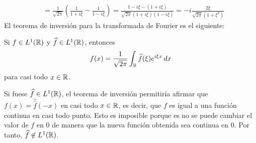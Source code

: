 \documentclass[a4paper, 12pt, extrafontsizes]{memoir}
\begin{document}
\begin{solution}
\begin{enumerate}
\begin{align*}
        &= \frac{1}{\sqrt{2\pi}}\left(\frac{1}{1+i\xi} -\frac{1}{1-i\xi}\right) = \frac{1-i\xi-(1+i\xi)}{\sqrt{2\pi}(1+i\xi)(1-i\xi)}  = -i\frac{2\xi}{\sqrt{2\pi}(1+\xi^2)}
    \end{align*}
    El teorema de inversión para la transformada de Fourier es el siguiente:
    \begin{theorem}
        Si $f \in L^1(\mathbb R)$ y $\widehat{f} \in L^1(\mathbb R)$, entonces
        \[f(x) = \frac{1}{\sqrt{2\pi}}\int_\mathbb R \widehat{f}(\xi)e^{i\xi x} \, dx\]
        para casi todo $x \in \mathbb R$.
    \end{theorem}
    Si fuese $\widehat{f}\in L^1(\mathbb R)$, el teorema de inversión permitiría afirmar que $f(x) = \widehat{\widehat{f}}(-x)$ en casi todo $x \in \mathbb R$, es decir, que $f$ es igual a una función continua en casi todo punto. Esto es imposible porque es no se puede cambiar el valor de $f$ en $0$ de manera que la nueva función obtenida sea continua en $0$. Por tanto, $\widehat{f} \not\in L^1(\mathbb R)$.
\end{enumerate}
\end{solution}
\end{document}
